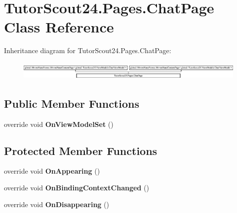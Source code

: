 \hypertarget{class_tutor_scout24_1_1_pages_1_1_chat_page}{}\section{Tutor\+Scout24.\+Pages.\+Chat\+Page Class Reference}
\label{class_tutor_scout24_1_1_pages_1_1_chat_page}
Inheritance diagram for Tutor\+Scout24.\+Pages.\+Chat\+Page\+:\begin{figure}[H]
\begin{center}
\leavevmode
\includegraphics[height=0.924092cm]{class_tutor_scout24_1_1_pages_1_1_chat_page}
\end{center}
\end{figure}
\subsection*{Public Member Functions}
\begin{DoxyCompactItemize}
\item 
\mbox{\label{class_tutor_scout24_1_1_pages_1_1_chat_page_a26b6bfc3220e6bda3d43dfa7dd1845c0}} 
override void {\bfseries On\+View\+Model\+Set} ()
\end{DoxyCompactItemize}
\subsection*{Protected Member Functions}
\begin{DoxyCompactItemize}
\item 
\mbox{\label{class_tutor_scout24_1_1_pages_1_1_chat_page_a50f0550750f09f987c73998d29f15804}} 
override void {\bfseries On\+Appearing} ()
\item 
\mbox{\label{class_tutor_scout24_1_1_pages_1_1_chat_page_a2eecc8f3a4726a6e5aa8dcfd573b2d24}} 
override void {\bfseries On\+Binding\+Context\+Changed} ()
\item 
\mbox{\label{class_tutor_scout24_1_1_pages_1_1_chat_page_a2135ebdb49a45c57135aec0f2565d352}} 
override void {\bfseries On\+Disappearing} ()
\end{DoxyCompactItemize}
